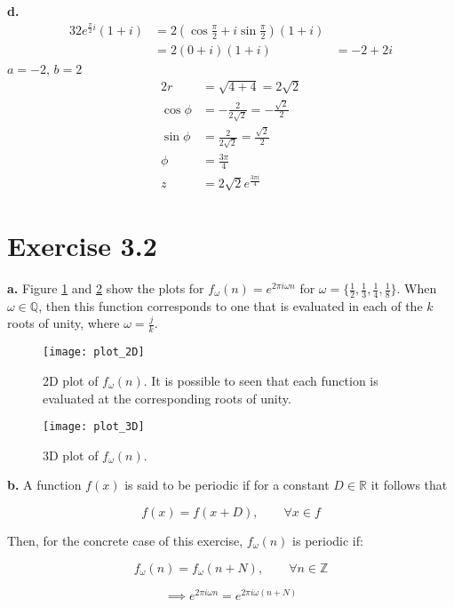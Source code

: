 \documentclass[12pt]{article}
\begin{document}
	\textbf{d.}
	\begin{alignat*}{3}
	2 e^{\frac{\pi}{2} i}(1 + i ) &= 2 (\cos\frac{\pi}{2} + i\sin \frac{\pi}{2})(1 + i)\\
	&= 2(0 + i)(1 + i) &= -2 + 2i
	\end{alignat*}
	$a = -2$, $b = 2$
	\begin{alignat*}{2}
	r &= \sqrt{4 + 4} = 2\sqrt{2}\\
	\cos\phi &= -\frac{2}{2\sqrt{2}} = -\frac{\sqrt{2}}{2}\\
	\sin\phi &= \frac{2}{2\sqrt{2}} = \frac{\sqrt{2}}{2}\\
	\phi &= \frac{3\pi}{4}\\
	z &= 2\sqrt{2}e^{\frac{3\pi i}{4}}
	\end{alignat*}
	
	\newpage
	\section*{Exercise 3.2}
	\textbf{a.} Figure \ref{fig:plot1} and \ref{fig:plot2} show the plots for $f_\omega(n) = e^{2\pi i \omega n}$ for $\omega = \{\frac{1}{2}, \frac{1}{3}, \frac{1}{4}, \frac{1}{8}\}$. When $\omega \in \mathbb{Q}$, then this function corresponds to one that is evaluated in each of the $k$ roots of unity, where $\omega = \frac{j}{k}$. \\
	
	\begin{figure}[h!]
	\centering
	\texttt{[image: plot\_2D]}
	\caption{2D plot of $f_\omega(n)$. It is possible to seen that each function is evaluated at the corresponding roots of unity. }
	\label{fig:plot1}
	\end{figure}
	
	\begin{figure}[h!]
	\centering
	\texttt{[image: plot\_3D]}
	\caption{3D plot of $f_\omega(n)$.}
	\label{fig:plot2}
	\end{figure}
	\newpage
	\textbf{b.} A function $f(x)$ is said to be periodic if for a constant $D \in \mathbb{R}$ it follows that 
	
	$$f(x) = f(x+D), \qquad \forall x \in f$$
	
	Then, for the concrete case of this exercise, $f_\omega (n)$ is periodic if:
	
	$$ f_\omega (n) = f_\omega (n + N), \qquad  \forall n \in \mathbb{Z}$$
	
	$$\implies e^{2\pi i \omega n} = e^{2\pi i \omega (n+N)}$$
	
\end{document}
